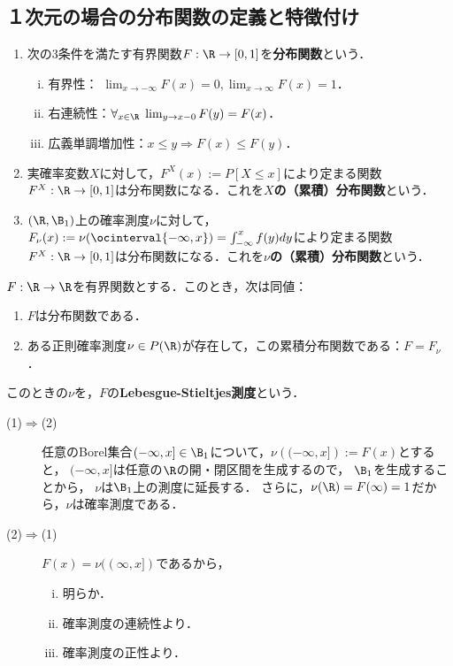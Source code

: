 \documentclass[uplatex,dvipdfmx]{jsreport}
\begin{document}
\subsection{１次元の場合の分布関数の定義と特徴付け}

\begin{definition}\mbox{}\label{def-distribution-function}
    \begin{enumerate}
        \item 次の3条件を満たす有界関数$F:\R\to[0,1]$を\textbf{分布関数}という．
        \begin{enumerate}[(i)]
            \item 有界性： $\lim_{x\to-\infty}F(x)=0,\lim_{x\to\infty}F(x)=1$．
            \item 右連続性：$\forall_{x\in\R}\;\lim_{y\to x-0}F(y)=F(x)$．
            \item 広義単調増加性：$x\le y\Rightarrow F(x)\le F(y)$．
        \end{enumerate}
        \item 実確率変数$X$に対して，$F^X(x):=P[X\le x]$により定まる関数$F^X:\R\to[0,1]$は分布関数になる．これを\textbf{$X$の（累積）分布関数}という．
        \item $(\R,\B_1)$上の確率測度$\nu$に対して，$F_\nu(x):=\nu(\ocinterval{-\infty,x})=\int^x_{-\infty}f(y)dy$により定まる関数$F^X:\R\to[0,1]$は分布関数になる．これを\textbf{$\nu$の（累積）分布関数}という．
    \end{enumerate}
\end{definition}

\begin{lemma}[任意の分布関数はある確率分布の累積分布関数である]
    $F:\R\to\R$を有界関数とする．このとき，次は同値：
    \begin{enumerate}
        \item $F$は分布関数である．
        \item ある正則確率測度$\nu\in P(\R)$が存在して，この累積分布関数である：$F=F_\nu$．
    \end{enumerate}
    このときの$\nu$を，$F$の\textbf{Lebesgue-Stieltjes測度}という．
\end{lemma}
\begin{Proof}\mbox{}
    \begin{description}
        \item[(1)$\Rightarrow$(2)] 任意のBorel集合${(-\infty,x]}\in\B_1$について，$\nu({(-\infty,x]}):=F(x)$とすると，
        ${(-\infty,x]}$は任意の$\R$の開・閉区間を生成するので，
        $\B_1$を生成することから，
        $\nu$は$\B_1$上の測度に延長する．
        さらに，$\nu(\R)=F(\infty)=1$だから，$\nu$は確率測度である．
        \item[(2)$\Rightarrow$(1)] $F(x)={\nu((\infty,x])}$であるから，
        \begin{enumerate}[(i)]
            \item 明らか．
            \item 確率測度の連続性より．
            \item 確率測度の正性より．
        \end{enumerate}
    \end{description}
\end{Proof}
\end{document}
